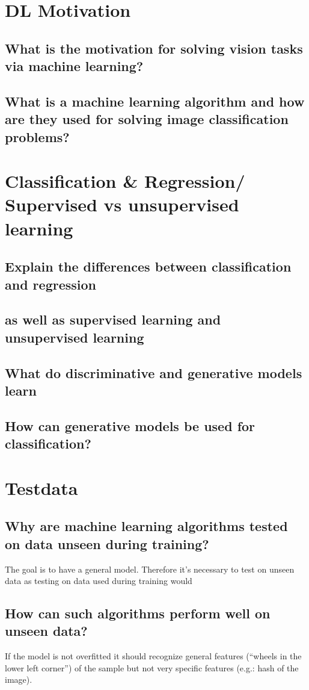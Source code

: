\section{DL Motivation}
\subsection{What is the motivation for solving vision tasks via machine learning?}
\subsection{What is a machine learning algorithm and how are they used for solving image classification problems?}

\section{Classification \& Regression/ Supervised vs unsupervised learning}
\subsection{Explain the differences between classification and regression }
\subsection{as well as supervised learning and unsupervised learning }
\subsection{What do discriminative and generative models learn }
\subsection{How can generative models be used for classification?}

\section{Testdata}
\subsection{Why are machine learning algorithms tested on data unseen during training?}
The goal is to have a general model. Therefore it's necessary to test on unseen data as testing on data used during training would 
\subsection{How can such algorithms perform well on unseen data?}
If the model is not overfitted it should recognize general features (``wheels in the lower left corner'') of the sample but not very specific features (e.g.: hash of the image). 
